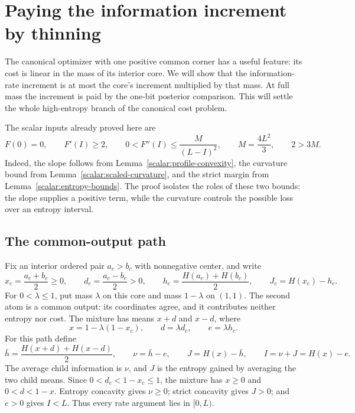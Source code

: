 \section{Paying the information increment by thinning}
\label{thinning:section}

The canonical optimizer with one positive common corner has a useful
feature: its cost is linear in the mass of its interior core.  We will
show that the information-rate increment is at most the core's
increment multiplied by that mass.  At full mass the increment is
paid by the one-bit posterior comparison.  This will settle the whole
high-entropy branch of the canonical cost problem.

The scalar inputs already proved here are
\begin{equation}
\label{thinning:scalar-inputs}
 F(0)=0,\qquad F'(I)\ge2,\qquad
 0<F''(I)\le\frac{M}{(L-I)^2},\qquad
 M=\frac{4L^2}{3},\qquad 2>3M.
\end{equation}
Indeed, the slope follows from
Lemma~\ref{scalar:profile-convexity}, the curvature bound from
Lemma~\ref{scalar:scaled-curvature}, and the strict margin from
Lemma~\ref{scalar:entropy-bounds}.  The proof isolates the roles of
these two bounds: the slope supplies a positive term, while the
curvature controls the possible loss over an entropy interval.

\subsection{The common-output path}

Fix an interior ordered pair $a_c>b_c$ with nonnegative center, and
write
\[
 x_c=\frac{a_c+b_c}{2}\ge0,\qquad
 d_c=\frac{a_c-b_c}{2}>0,\qquad
 h_c=\frac{H(a_c)+H(b_c)}2,\qquad
 J_c=H(x_c)-h_c.
\]
For $0<\lambda\le1$, put mass $\lambda$ on this core and mass
$1-\lambda$ on $(1,1)$.  The second atom is a common output: its
coordinates agree, and it contributes neither entropy nor cost.  The
mixture has means $x+d$ and $x-d$, where
\begin{equation}
\label{thinning:path}
 x=1-\lambda(1-x_c),\qquad d=\lambda d_c,
 \qquad e=\lambda h_c.
\end{equation}
For this path define
\begin{equation}
\label{thinning:information}
 \bar h=\frac{H(x+d)+H(x-d)}2,\qquad
 \nu=\bar h-e,\qquad J=H(x)-\bar h,
 \qquad I=\nu+J=H(x)-e.
\end{equation}
The average child information is $\nu$, and $J$ is the entropy gained
by averaging the two child means.  Since
$0<d_c<1-x_c\le1$, the mixture has $x\ge0$ and
$0<d<1-x$.  Entropy concavity gives $\nu\ge0$; strict concavity
gives $J>0$; and $e>0$ gives $I<L$.  Thus every rate argument lies
in $[0,L)$.

